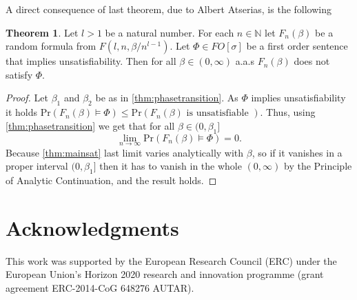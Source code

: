 \documentclass[12pt,notitlepage,a4paper]{article}
\theoremstyle{definition}
\newtheorem{theorem}{Theorem}[section]
\newcommand{\N}{\mathbb{N}}
\newcommand{\Ln}{\lim\limits_{n\to \infty}}
\newcommand{\PR}[1]{\mathrm{Pr}\left(#1\right)}
\begin{document}
A direct consequence of last theorem, due to Albert Atserias, is the following

\begin{theorem} \label{thm:satapplication}
	Let $l>1$ be a natural number.
	For each $n\in \N$ let $F_n(\beta)$ be a random formula from
	$F(l,n,\beta/n^{l-1})$. Let $\Phi\in FO[\sigma]$ be a first order
	sentence that implies unsatisfiability.  Then for all $\beta\in (0,\infty)$
	a.a.s $F_n(\beta)$ does not satisfy $\Phi$.
\end{theorem}
\begin{proof}
	Let $\beta_1$ and $\beta_2$ be as in \cref{thm:phasetransition}. 
	As $\Phi$ implies unsatisfiability it holds
	$\PR{F_n(\beta)\models \Phi  }\leq  
	\PR{F_n(\beta) \text{ is unsatisfiable }  }$. Thus, using \cref{thm:phasetransition}
	we get that for all $\beta\in (0,\beta_1]$
	\[
	\Ln \PR{F_n(\beta)\models \Phi  }=0.
	\]
	Because \cref{thm:mainsat} last limit varies analytically with $\beta$, so
	if it vanishes in a proper interval $(0,\beta_1]$ then it has to vanish
	in the whole $(0,\infty)$ by the Principle of Analytic Continuation, and the result 
	holds. 
\end{proof}




\section*{Acknowledgments}
This work was supported by the European Research Council (ERC) under the European Union's 
Horizon 2020 research and innovation programme (grant agreement ERC-2014-CoG 648276 AUTAR).\par
{}



	
\end{document}
